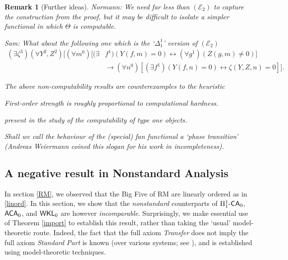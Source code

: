 \documentclass[reqno]{amsart}
\newtheorem{rem}[thm]{Remark}
\def\FIVE{\Pi_{1}^{1}\text{-\textsf{CA}}_{0}}
\def\WKL{\textup{\textsf{WKL}}}
\def\E{{\mathcal  E}}
\def\di{\rightarrow}
\def\asa{\leftrightarrow}
\def\ACA{\textup{\textsf{ACA}}}
\numberwithin{equation}{section}
\numberwithin{thm}{section}
\begin{document}
\begin{rem}[Further ideas]\rm
Normann: We need far less than $(\E_{2})$ to capture the construction from the proof, but it may be difficult to isolate a simpler functional in which $\Theta$ is computable.

\medskip

Sam: What about the following one which is the `$\Delta_{1}^{1}$' version of $(\E_{2})$
\begin{align*}%
(\exists \zeta^{3})(\forall Y^{2}, Z^{2})\big[ (\forall m^{0})[(\exists & f^{1})(Y(f, m)=0) \asa (\forall g^{1})(Z(g,m)\ne0)] \\
& \di  (\forall n^{0})[(\exists f^{1})(Y(f,n)=0)\asa \zeta(Y, Z,n)=0]  \big].
\end{align*}

The above non-computability results are counterexamples to the heuristic
\begin{center}
\emph{First-order strength is roughly proportional to computational hardness}.  
\end{center}
present in the study of the computability of type one objects.

\medskip

Shall we call the behaviour of the (special) fan functional a `phase transition' (Andreas Weiermann coined this slogan for his work in incompleteness).  
\end{rem}

\subsection{A negative result in Nonstandard Analysis}
%
In section \ref{RM}, we observed that the Big Five of RM are linearly ordered as in \eqref{linord}.  
In this section, we show that the \emph{nonstandard} counterparts of $\FIVE$, $\ACA_{0}$, and $\WKL_{0}$ are however \emph{incomparable}.  
Surprisingly, we make essential use of Theorem \ref{import} to establish this result, rather than taking the `usual' model-theoretic route.  
Indeed, the fact that the full axiom \emph{Transfer} does not imply the full axiom \emph{Standard Part} is known (over various systems; see \cites{blaaskeswijsmaken, gordon2}), and is established using model-theoretic techniques.
\end{document}
